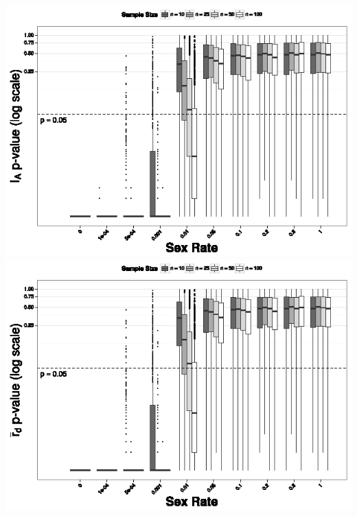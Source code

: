 \documentclass[letterpaper, 10pt]{article}
\begin{document}
\includegraphics{figures/Ia_pval2.eps}
\includegraphics{figures/rbarD_pval2.eps}\\
\end{document}
